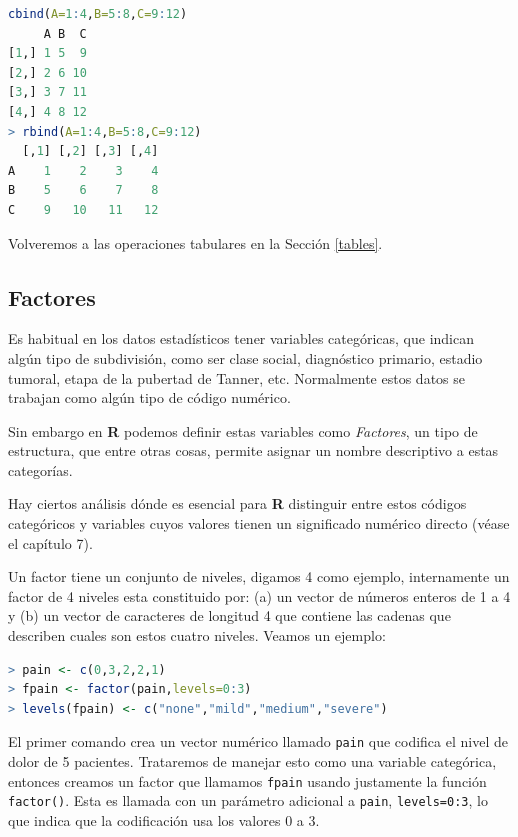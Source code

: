 \begin{lstlisting}[language=R]
cbind(A=1:4,B=5:8,C=9:12)
     A B  C
[1,] 1 5  9
[2,] 2 6 10
[3,] 3 7 11
[4,] 4 8 12
> rbind(A=1:4,B=5:8,C=9:12)
  [,1] [,2] [,3] [,4]
A    1    2    3    4
B    5    6    7    8
C    9   10   11   12
\end{lstlisting}

Volveremos a las operaciones tabulares en la Sección \ref{tables}.

\subsection{Factores}\label{factors}

Es habitual en los datos estadísticos tener variables categóricas, que indican
algún tipo de subdivisión, como ser clase social, diagnóstico primario, estadio
tumoral, etapa de la pubertad de Tanner, etc. Normalmente estos datos se
trabajan como algún tipo de código numérico.

Sin embargo en \textbf{R} podemos definir estas variables como
\textit{Factores}, un tipo de estructura, que entre otras cosas, permite
asignar un nombre descriptivo a estas categorías.

Hay ciertos análisis dónde es esencial para \textbf{R} distinguir
entre estos códigos categóricos y variables cuyos valores tienen un significado
numérico directo (véase el capítulo 7).

Un factor tiene un conjunto de niveles, digamos 4 como ejemplo, internamente un
factor de 4 niveles esta constituido por: (a) un vector de números enteros de 1
a 4 y (b) un vector de caracteres de longitud 4 que contiene las cadenas que
describen cuales son estos cuatro niveles. Veamos un ejemplo:

\begin{lstlisting}[language=R]
> pain <- c(0,3,2,2,1)
> fpain <- factor(pain,levels=0:3)
> levels(fpain) <- c("none","mild","medium","severe")
\end{lstlisting}

El primer comando crea un vector numérico llamado \texttt{pain} que codifica el
nivel de dolor de 5 pacientes. Trataremos de manejar esto como una variable
categórica, entonces creamos un factor que llamamos \texttt{fpain} usando
justamente la función \texttt{factor()}. Esta es llamada con un parámetro
adicional a \texttt{pain}, \texttt{levels=0:3}, lo que indica que la
codificación usa los valores 0 a 3.

